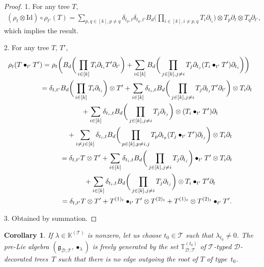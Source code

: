 \documentclass[10pt,a4paper]{amsart}
\numberwithin{equation}{section}
\newtheorem{Corollary}[Theorem]{Corollary}
\newcommand{\K}{\mathbb{K}}
\newcommand{\T}{\mathcal{T}}
\newcommand{\D}{\mathcal{D}}
\newcommand{\g}{\mathfrak{g}}
\newcommand{\bfT}{\mathbb{T}}
\newcommand{\id}{\mathrm{Id}}
\begin{document}
\begin{proof} 1. For any tree $T$,
\begin{gather*}
(\rho_t\otimes \id)\circ \rho_{t'}(T)=\sum_{p,q\in [k], p\neq q}
\delta_{t_p,t}\delta_{t_q,t'} B_d\bigg(\prod_{i\in [k], i\neq p,q}T_i\partial_{t_i}
\bigg)\otimes T_p \partial_t \otimes T_q\partial_{t'},
\end{gather*}
which implies the result.

2. For any tree $T$, $T'$,
\begin{gather*}
\rho_t(T\bullet_{t'} T')=\rho_t\bigg(B_d\bigg(\prod_{i\in [k]}T_i\partial_{t_i} T'\partial_{t'}\bigg)
+\sum_{i\in [k]} B_d\bigg(\prod_{j\in [k], j\neq i}T_j \partial_{t_j} (T_i\bullet_{t'}T')\partial_{t_i}\bigg)\bigg)
\\ \hphantom{\rho_t(T\bullet_{t'} T')}
{}=\delta_{t,t'}B_d\bigg(\prod_{i\in [k]}T_i\partial_{t_i}\bigg)\otimes T'+\sum_{i\in [k]} \delta_{t_i,t}
B_d\bigg(\prod_{j\in [k],j\neq i}T_j\partial_{t_j} T'\partial_{t'}\bigg)\otimes T_i\partial_t
\\ \hphantom{\rho_t(T\bullet_{t'} T')=}
{}+\sum_{i\in [k]}\delta_{t_i,t}B_d\bigg(\prod_{j\in [k], j\neq i}T_j \partial_{t_j} \bigg)\otimes (T_i\bullet_{t'}T')\partial_t
\\ \hphantom{\rho_t(T\bullet_{t'} T')=}
{}+\sum_{i\neq j \in [k]}\delta_{t_i,t}
B_d\bigg(\prod_{p\in [k],p\neq i,j} T_p \partial_{t_p} (T_j\bullet_{t'} T')\partial_{t_j}\bigg)\otimes T_i \partial_t
\\ \hphantom{\rho_t(T\bullet_{t'} T')}
{}=\delta_{t,t'}T\otimes T'+\sum_{i\in [k]} \delta_{t_i,t}
B_d\bigg(\prod_{j\in [k],j\neq i}T_j\partial_{t_j}\bigg)\bullet_{t'} T'\otimes T_i \partial_t
\\ \hphantom{\rho_t(T\bullet_{t'} T')=}
{}+\sum_{i\in [k]} \delta_{t_i,t}B_d\bigg(\prod_{j\in [k],j\neq i}T_j\partial_{t_j}\bigg)\otimes T_i \bullet_{t'} T'\partial_t
\\ \hphantom{\rho_t(T\bullet_{t'} T')}
{}=\delta_{t,t'}T\otimes T'+T^{(1)_t}\bullet_{t'}T'\otimes T^{(2)_t}+T^{(1)_t}\otimes T^{(2)_t}\bullet_{t'}T'.
\end{gather*}

3. Obtained by summation. \end{proof}

\begin{Corollary} \label{cor15}
If $\lambda \in \K^{(\T)}$ is nonzero, let us choose $t_0\in \T$ such that $\lambda_{t_0}\neq 0$.
The pre-Lie algebra $(\g_{\D,\T}, \bullet_\lambda)$ is freely generated by the set
$\bfT_{\D,\T}^{(t_0)}$ of $\T$-typed $\D$-decorated trees~$T$ such that
there is no edge outgoing the root of $T$ of type~$t_0$.
\end{Corollary}
\end{document}
